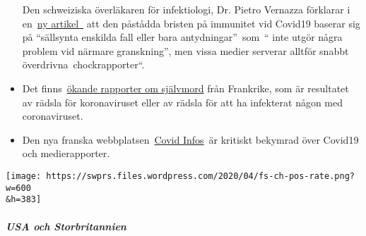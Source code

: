 \begin{itemize}
  Den schweiziska överläkaren för infektiologi, Dr. Pietro Vernazza
  förklarar i
  en~\href{https://infekt.ch/2020/04/hinterlaesst-coronavirus-eine-immunitaet/}{ny
  artikel~} att den påstådda bristen på immunitet vid Covid19 baserar
  sig på ``sällsynta enskilda fall eller bara antydningar''~som~`` inte
  utgör några problem vid närmare granskning'', men vissa medier
  serverar alltför snabbt överdrivna~chockrapporter``.
\item
  Det
  finns~\href{https://www.midilibre.fr/2020/04/09/coronavirus-ces-suicides-de-malades-ou-de-personnes-tenaillees-par-langoisse,8839373.php}{ökande
  rapporter om självmord} från Frankrike, som är resultatet av rädsla
  för koronaviruset eller av rädsla för att ha infekterat någon med
  coronaviruset.
\item
  Den nya franska webbplatsen~\href{https://covidinfos.net/}{Covid
  Infos}~är kritiskt bekymrad över Covid19 och medierapporter.
\end{itemize}

\texttt{[image: https://swprs.files.wordpress.com/2020/04/fs-ch-pos-rate.png?w=600\\\&h=383]}

\hypertarget{usa-och-storbritannien}{%
\subparagraph{\texorpdfstring{\textbf{USA och
Storbritannien}}{USA och Storbritannien}}\label{usa-och-storbritannien}}


